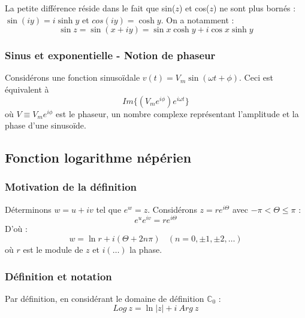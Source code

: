     La petite différence réside dans le fait que sin($z$) et cos($z$) ne sont plus bornés : $\sin(iy) = i\sinh
    y$ et $cos(iy) = \cosh y$. On a notamment :
    \begin{equation}
    \sin z = \sin(x+iy) = \sin x \cosh y + i \cos x \sinh y
    \end{equation}
    
        \subsubsection{Sinus et exponentielle - Notion de phaseur}
        Considérons une fonction sinusoïdale $v(t) = V_m\sin(\omega t + \phi)$. Ceci est équivalent à 
        \begin{equation}
        Im\{(V_me^{i\phi})e^{i\omega t} \}
        \end{equation}
        où $V \equiv V_me^{i\phi}$ est le phaseur, un nombre complexe représentant l'amplitude et la phase
        d'une sinusoïde.
        
    \subsection{Fonction logarithme népérien}
        \subsubsection{Motivation de la définition}
    Déterminons $w = u+iv$ tel que $e^w = z$. Considérons $z = re^{i\Theta}$ avec $-\pi <\Theta \leq \pi$ :
    \begin{equation}
    e^ue^{iv} = re^{i\Theta}
    \end{equation}
    D'où :
    \begin{equation}
    w = \ln r + i(\Theta + 2n\pi)\ \ \ \ (n=0, \pm 1, \pm2,\dots)
    \end{equation}
    où $r$ est le module de $z$ et $i(\dots)$ la phase.
    
        \subsubsection{Définition et notation}
        Par définition, en considérant le domaine de définition $\mathbb{C}_0$ :
        \begin{equation}
        Log\ z = \ln |z| + i\ Arg\ z
        \end{equation}
        \ \\
        
